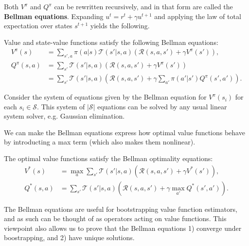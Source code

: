 \documentclass[twoside,10pt]{report}
\begin{document}
Both $V^{\pi}$ and $Q^{\pi}$ can be rewritten recursively, and in that form are called the \textbf{Bellman equations}. Expanding $u^{t} = r^{t} + \gamma u^{t+1}$ and applying the law of total expectation over states $s^{t+1}$ yields the following.

\begin{prop}
	Value and state-value functions satisfy the following Bellman equations:
\begin{align*}
	V^{\pi}(s) &= \sum_{s',a} \pi(a|s) \mathcal{T}(s'|s,a) \left( \mathcal{R}(s,a,s') + \gamma V^{\pi}(s') \right), \\
	Q^{\pi}(s,a) &= \sum_{s'} \mathcal{T}(s'|s,a) \left( \mathcal{R}(s,a,s') + \gamma V^{\pi}(s') \right) \\
		   &= \sum_{s'} \mathcal{T}(s'|s,a) \left( \mathcal{R}(s,a,s') + \gamma \sum_{a'} \pi(a'|s') Q^{\pi}(s', a') \right).
\end{align*}

\end{prop}

Consider the system of equations given by the Bellman equation for $V^{\pi}(s_i)$ for each $s_{i} \in \mathcal{S}$. This system of $|\mathcal{S}|$ equations can be solved by any usual linear system solver, e.g. Gaussian elimination.

	We can make the Bellman equations express how optimal value functions behave by introducting a max term (which also makes them nonlinear).
\begin{prop}[]
	The optimal value functions satisfy the Bellman optimality equations:
	\begin{align*}
		V^{*}(s) &= \max_{a}\sum_{s'}\mathcal{T}(s'|s,a) \left( \mathcal{R}(s,a,s') + \gamma V^{*}(s') \right), \\
		Q^{*}(s,a) &= \sum_{s'} \mathcal{T}(s'|s,a) \left( \mathcal{R}(s,a,s') + \gamma \max_{a'}Q^{*}(s',a') \right).
	\end{align*}
\end{prop}

The Bellman equations are useful for bootstrapping value function estimators, and as such can be thought of as operators acting on value functions. This viewpoint also allows us to prove that the Bellman equations 1) converge under boostrapping, and 2) have unique solutions.
\end{document}
